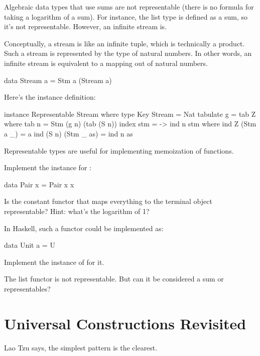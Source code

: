 \documentclass[DaoFP]{subfiles}
\begin{document}
Algebraic data types that use sums are not representable (there is no formula for taking a logarithm of a sum). For instance, the list type is defined as a sum, so it's not representable. However, an infinite stream is. 

Conceptually, a stream is like an infinite tuple, which is technically a product. Such a stream is represented by the type of natural numbers. In other words, an infinite stream is equivalent to a mapping out of natural numbers. 
\begin{haskell}
data Stream a = Stm a (Stream a)
\end{haskell}
Here's the instance definition:
\begin{haskell}
instance Representable Stream where
  type Key Stream = Nat
  tabulate g = tab Z
    where
      tab n = Stm (g n) (tab (S n))
  index stm = \n -> ind n stm
    where
      ind Z (Stm a _) = a
      ind (S n) (Stm _ as) = ind n as
\end{haskell}
Representable types are useful for implementing  memoization of functions.

\begin{exercise}
Implement the  instance for :
\begin{haskell}
data Pair x = Pair x x
\end{haskell}
\end{exercise}

\begin{exercise}
Is the constant functor that maps everything to the terminal object representable? Hint: what's the logarithm of 1?

In Haskell, such a functor could be implemented as:
\begin{haskell}
data Unit a = U
\end{haskell}
Implement the instance of  for it.
\end{exercise}

\begin{exercise}
The list functor is not representable. But can it be considered a sum or representables?
\end{exercise}

\section{Universal Constructions Revisited}

Lao Tzu says, the simplest pattern is the clearest.
\end{document}
